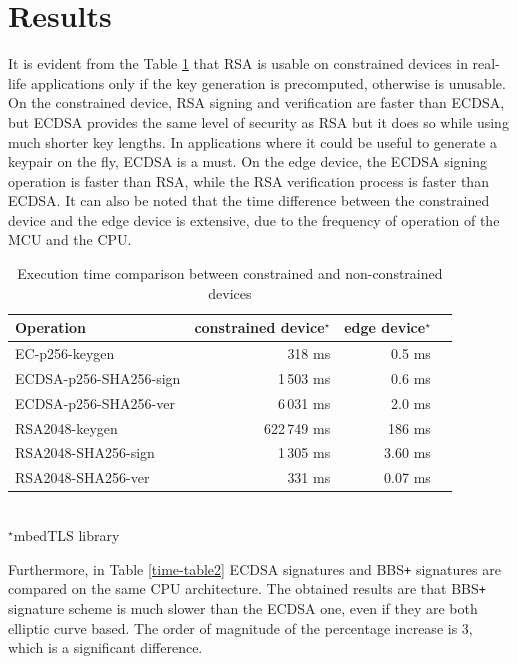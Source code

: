 \section{Results}
\label{sec-results}
It is evident from the Table \ref{time-table1} that RSA is usable on constrained devices in real-life applications only if the key generation is precomputed, otherwise is unusable. On the constrained device, RSA signing and verification are faster than ECDSA, but ECDSA provides the same level of security as RSA but it does so while using much shorter key lengths. In applications where it could be useful to generate a keypair on the fly, ECDSA is a must. On the edge device, the ECDSA signing operation is faster than RSA, while the RSA verification process is faster than ECDSA.  It can also be noted that the time difference between the constrained device and the edge device is extensive, due to the frequency of operation of the MCU and the CPU.

\begin{table}[!h]
    \centering
    \begin{tabular}{| l || r | r | r |}
        \hline      
        \textbf{Operation} & \textbf{constrained device}$^\star$ & \textbf{edge device}$^\star$ \\ [0.5ex] 
        \hline \hline 
        EC-p256-keygen                  & 318 ms  & 0.5 ms \\
        \hline
        ECDSA-p256-SHA256-sign          & 1\,503 ms & 0.6 ms \\
        \hline
        ECDSA-p256-SHA256-ver           & 6\,031 ms & 2.0 ms \\
        \hline \hline
        RSA2048-keygen                  & 622\,749 ms  & 186  ms \\
        \hline
        RSA2048-SHA256-sign          & 1\,305 ms & 3.60 ms \\
        \hline
        RSA2048-SHA256-ver           & 331 ms & 0.07  ms \\
        \hline
    \end{tabular}\\
    \footnotesize $^\star$mbedTLS library
    \caption{Execution time comparison between constrained and non-constrained devices}
    \label{time-table1}
\end{table}

Furthermore, in Table \ref{time-table2} ECDSA signatures and BBS\texttt{+} signatures are compared on the same CPU architecture. The obtained results are that BBS\texttt{+} signature scheme is much slower than the ECDSA one, even if they are both elliptic curve based. The order of magnitude of the percentage increase is 3, which is a significant difference. 
   
